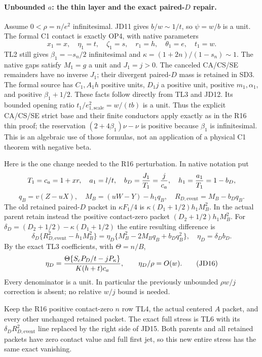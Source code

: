 \paragraph{Unbounded $a$: the thin layer and the exact paired-$D$ repair.}
Assume $0<\rho=n/e^2$ infinitesimal.  JD11 gives
$b/w\sim1/t$, so $\psi=w/b$ is a unit.  The formal C1 contact is
exactly OP4, with native parameters
\[
 x_1=x,\quad\eta_1=t,\quad\zeta_1=s,\quad r_1=h,
 \quad\theta_1=e,\quad t_1=w.
\]
TL2 still gives $\beta_1=-s_n/2$ infinitesimal and
$\kappa=(1+2n)/(1-s_n)\sim1$.  The native gaps satisfy
$M_1=g$ a unit and $J_1=j>0$.  The canceled CA/CS/SE remainders
have no inverse $J_1$; their divergent paired-$D$ mass is retained
in SD3.  The formal source has $C_1,A_1h$ positive units,
$D_1j$ a positive unit, positive $m_1,\alpha_1$, and positive
$\beta_1+1/2$.  These facts follow directly from TL3 and JD12.
Its bounded opening ratio $t_1/e_{1,\mathrm{scale}}^2=w/(tb)$
is a unit.  Thus the explicit CA/CS/SE strict base and their finite
conductors apply exactly as in the R16 thin proof; the reservation
$(2+4\beta_1)\nu-\nu$ is positive because $\beta_1$ is
infinitesimal.  This is an algebraic use of those formulas, not an
application of a physical C1 theorem with negative beta.

Here is the one change needed to the R16 perturbation.  In native
notation put
\[
 T_1=c_a=1+xr,\quad a_1=l/t,\quad
 b_D={J_1\over T_1}={j\over c_a},\quad
 h_1={a_1\over T_1}=1-b_D,
\]
\[
 q_B=v(Z-uX),\quad M_B=(uW-Y)-h_1q_B,
 \quad R_{D,\mathrm{event}}=M_B-b_Dq_B.               \tag{JD14}
\]
The old retained paired-$D$ packet in $\kappa F_1/4$ is
$\kappa(D_1+1/2)h_1M_B^2$.  In the actual parent retain instead
the positive contact-zero packet $(D_2+1/2)h_1M_B^2$.
For $\delta_D=(D_2+1/2)-\kappa(D_1+1/2)$ the entire resulting
difference is
\[
 \boxed{\quad
 \delta_D\{R_{D,\mathrm{event}}^2-h_1M_B^2\}
 =\eta_D\{M_B^2-2M_Bq_B+b_Dq_B^2\},\quad
 \eta_D=\delta_D b_D.\quad}                          \tag{JD15}
\]
By the exact TL3 coefficients, with $\Theta=n/B$,
\[
 \eta_D={\Theta\{S_cP_D/t-jP_\kappa\}
                    \over K(h+t)c_a},\qquad
       \eta_D/\rho=O(w).                            \tag{JD16}
\]
Every denominator is a unit.  In particular the previously unbounded
$\rho w/j$ correction is absent; no relative $w/j$ bound is needed.

Keep the R16 positive contact-zero $n$ row TL4, the actual centered
$A$ packet, and every other unchanged retained packet.  The exact
full stress is TL6 with its $\delta_D R_{D,\mathrm{event}}^2$
line replaced by the right side of JD15.  Both parents and all
retained packets have zero contact value and full first jet, so this
new entire stress has the same exact vanishing.

